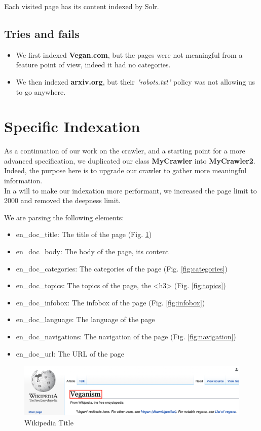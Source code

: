 \documentclass[a4paper]{article}
\begin{document}
Each visited page has its content indexed by Solr.

\subsection{Tries and fails}
\begin{itemize}  
\item We first indexed \textbf{Vegan.com}, but the pages were not meaningful from a feature point of view, indeed it had no categories.
\item We then indexed  \textbf{arxiv.org}, but their \textit{"robots.txt"} policy was not allowing us to go anywhere.
\end{itemize}

\section{Specific Indexation}
As a continuation of our work on the crawler, and a starting point for a more advanced specification, we duplicated our class \textbf{MyCrawler} into \textbf{MyCrawler2}. Indeed, the purpose here is to upgrade our crawler to gather more meaningful information.\\

In a will to make our indexation more performant, we increased the page limit to 2000 and removed the deepness limit.

We are parsing the following elements:
\begin{itemize}
\item en\_doc\_title: The title of the page (Fig. \ref{fig:title})
\item en\_doc\_body: The body of the page, its content
\item en\_doc\_categories: The categories of the page (Fig. \ref{fig:categories})
\item en\_doc\_topics: The topics of the page, the <h3> (Fig. \ref{fig:topics})
\item en\_doc\_infobox: The infobox of the page (Fig. \ref{fig:infobox})
\item en\_doc\_language: The language of the page
\item en\_doc\_navigations: The navigation of the page (Fig. \ref{fig:navigation})
\item en\_doc\_url: The URL of the page
\end{itemize}


\begin{figure}[H]
	\includegraphics[width=\linewidth]{imgs/title}
	\caption{Wikipedia Title}
	\label{fig:title}
\end{figure}
\end{document}
